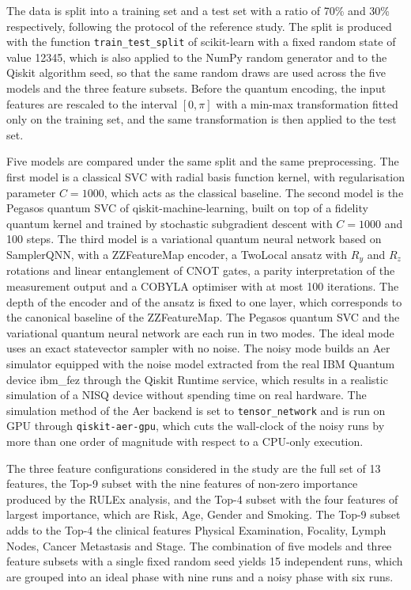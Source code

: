 The data is split into a training set and a test set with a ratio of 70\% and 30\% respectively, following the protocol of the reference study. The split is produced with the function \texttt{train\_test\_split} of scikit-learn with a fixed random state of value 12345, which is also applied to the NumPy random generator and to the Qiskit algorithm seed, so that the same random draws are used across the five models and the three feature subsets. Before the quantum encoding, the input features are rescaled to the interval $[0, \pi]$ with a min-max transformation fitted only on the training set, and the same transformation is then applied to the test set.

Five models are compared under the same split and the same preprocessing. The first model is a classical SVC with radial basis function kernel, with regularisation parameter $C = 1000$, which acts as the classical baseline. The second model is the Pegasos quantum SVC of qiskit-machine-learning, built on top of a fidelity quantum kernel and trained by stochastic subgradient descent with $C = 1000$ and 100 steps. The third model is a variational quantum neural network based on SamplerQNN, with a ZZFeatureMap encoder, a TwoLocal ansatz with $R_y$ and $R_z$ rotations and linear entanglement of CNOT gates, a parity interpretation of the measurement output and a COBYLA optimiser with at most 100 iterations. The depth of the encoder and of the ansatz is fixed to one layer, which corresponds to the canonical baseline of the ZZFeatureMap. The Pegasos quantum SVC and the variational quantum neural network are each run in two modes. The ideal mode uses an exact statevector sampler with no noise. The noisy mode builds an Aer simulator equipped with the noise model extracted from the real IBM Quantum device ibm\_fez through the Qiskit Runtime service, which results in a realistic simulation of a NISQ device without spending time on real hardware. The simulation method of the Aer backend is set to \texttt{tensor\_network} and is run on GPU through \texttt{qiskit-aer-gpu}, which cuts the wall-clock of the noisy runs by more than one order of magnitude with respect to a CPU-only execution.

The three feature configurations considered in the study are the full set of 13 features, the Top-9 subset with the nine features of non-zero importance produced by the RULEx analysis, and the Top-4 subset with the four features of largest importance, which are Risk, Age, Gender and Smoking. The Top-9 subset adds to the Top-4 the clinical features Physical Examination, Focality, Lymph Nodes, Cancer Metastasis and Stage. The combination of five models and three feature subsets with a single fixed random seed yields 15 independent runs, which are grouped into an ideal phase with nine runs and a noisy phase with six runs.


